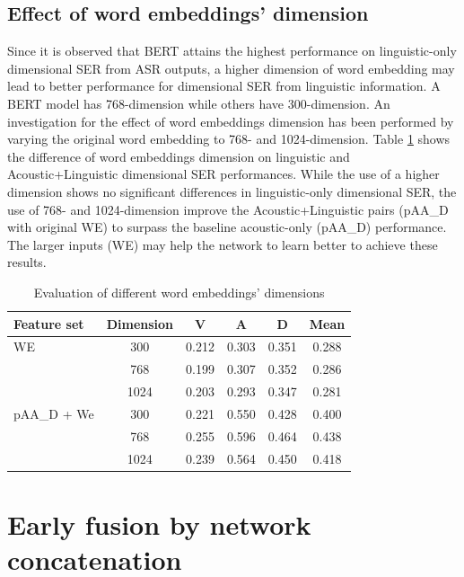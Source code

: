 
\subsection{Effect of word embeddings' dimension}
Since it is observed that BERT attains the highest performance on
linguistic-only dimensional SER from ASR outputs, a higher dimension of word
embedding may lead to better performance for dimensional SER from linguistic
information. A BERT model has 768-dimension while others have 300-dimension. An
investigation for the effect of word embeddings dimension has been performed by
varying the original word embedding to 768- and 1024-dimension. Table
\ref{tab:ter_we_dim} shows the difference of word embeddings dimension on
linguistic and Acoustic+Linguistic dimensional SER performances. While the use
of a higher dimension shows no significant differences in linguistic-only
dimensional SER, the use of 768- and 1024-dimension improve the
Acoustic+Linguistic pairs (pAA\_D with original WE) to surpass the baseline
acoustic-only (pAA\_D) performance. The larger inputs (WE) may help the network
to learn better to achieve these results.

\begin{table}[htbp]
  \caption{Evaluation of different word embeddings' dimensions}
  \begin{center}
  \begin{tabular}{l | c | c c c c}
    \hline
Feature set & Dimension & V   &   A &   D   &   Mean \\
\hline \hline
WE          & 300   & 0.212   & 0.303 & 0.351 & 0.288 \\
& 768   & 0.199   & 0.307 & 0.352 & 0.286 \\
& 1024  & 0.203   & 0.293 & 0.347 & 0.281 \\
pAA\_D + We & 300   & 0.221   & 0.550 & 0.428 & 0.400 \\
& 768   & 0.255   & 0.596 & 0.464 & 0.438 \\
& 1024  & 0.239   & 0.564 & 0.450 & 0.418 \\
    \hline
  \end{tabular}
  \label{tab:ter_we_dim}
  \end{center}
\end{table}

\section{Early fusion by network concatenation}
